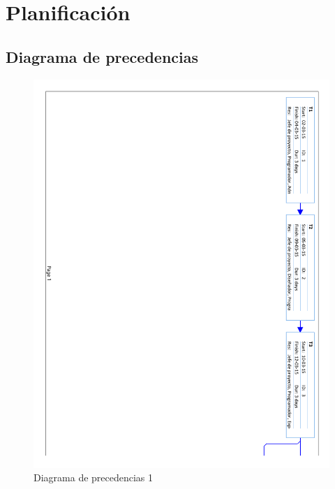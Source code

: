 \chapter{Planificación}

\section{Diagrama de precedencias}

\begin{figure}[!htbp]
	\centering
	\includegraphics[page=1, scale=.65]{fig/network_diagram}
	\caption{Diagrama de precedencias 1}
\end{figure}

